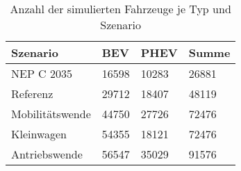{
\renewcommand{\arraystretch}{1.2}%
\begin{table}[H]
	\begin{center}
		\caption{Anzahl der simulierten Fahrzeuge je Typ und Szenario}
		\begin{tabu} to 0.6\textwidth {X[1.2] X[1, r] X[1, r] X[1, r]}
			\hline
			Szenario         & BEV         & PHEV        & Summe       \\ \hline
			NEP C \num{2035} & \num{16598} & \num{10283} & \num{26881} \\
			Referenz         & \num{29712} & \num{18407} & \num{48119} \\
			Mobilitätswende  & \num{44750} & \num{27726} & \num{72476} \\
			Kleinwagen       & \num{54355} & \num{18121} & \num{72476} \\
			Antriebswende    & \num{56547} & \num{35029} & \num{91576} \\ \hline
		\end{tabu}
		\label{tab:car_count}
	\end{center}
	\vspace{-3mm}%
\end{table}
}